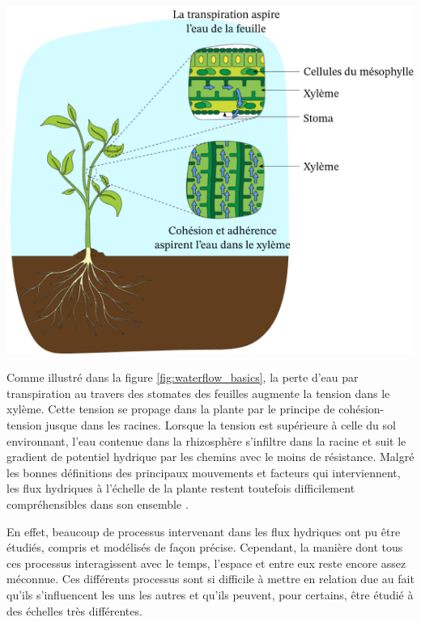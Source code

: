 \begin{minipage}{0.5\linewidth}
\captionsetup{type=figure,hypcap=true}
\centering
\includegraphics[width=\linewidth]{Image/waterflow_basics.png}
\label{fig:waterflow_basics}
\end{minipage}\hfill
\begin{minipage}{0.45\linewidth}
Comme illustré dans la figure \ref{fig:waterflow_basics}, la perte d'eau par transpiration au travers des stomates des feuilles augmente la tension dans le xylème. Cette tension se propage dans la plante par le principe de cohésion-tension jusque dans les racines.
Lorsque la tension est supérieure à celle du sol environnant, l'eau contenue dans la rhizosphère s'infiltre dans la racine et suit le gradient de potentiel hydrique par les chemins avec le moins de résistance.
Malgré les bonnes définitions des principaux mouvements et facteurs qui interviennent, les flux hydriques à l'échelle de la plante restent toutefois difficilement compréhensibles dans son ensemble \citep{lobet_plant_2014}.
\end{minipage} 
\newline

\noindent En effet, beaucoup de processus intervenant dans les flux hydriques ont pu être étudiés, compris et modélisés de façon précise.
Cependant, la manière dont tous ces processus interagissent avec le temps, l'espace et entre eux reste encore assez méconnue.
Ces différents processus sont si difficile à mettre en relation due au fait qu'ils s'influencent les uns les autres et qu'ils peuvent, pour certains, être étudié à des échelles très différentes.
\newline

